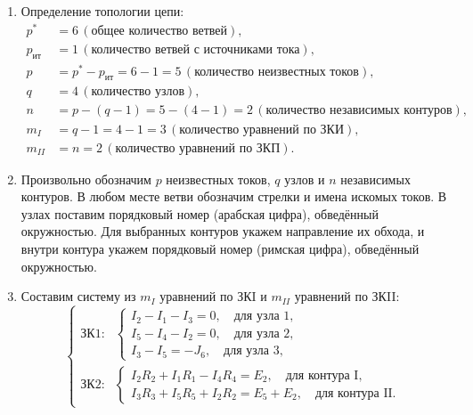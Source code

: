 \begin{enumerate}
	\item Определение топологии цепи:
	      \begin{align*}
		      p^*           & = 6 \, (\text{общее количество ветвей}),                                     \\
		      p_{\text{ит}} & = 1 \, (\text{количество ветвей с источниками тока}),                        \\
		      p             & = p^* - p_{\text{ит}} = 6 - 1 = 5 \, (\text{количество неизвестных токов}),  \\
		      q             & = 4 \, (\text{количество узлов}),                                            \\
		      n             & = p - (q - 1) = 5 - (4 - 1) = 2 \, (\text{количество независимых контуров}), \\
		      m_I           & = q - 1 = 4 - 1 = 3 \, (\text{количество уравнений по ЗКИ}),                 \\
		      m_{II}        & = n = 2 \, (\text{количество уравнений по ЗКП}).
	      \end{align*}

	\item Произвольно обозначим $p$ неизвестных токов, $q$ узлов и $n$ независимых контуров. В любом месте ветви обозначим стрелки и имена искомых токов. В узлах поставим порядковый номер (арабская цифра), обведённый окружностью. Для выбранных контуров укажем направление их обхода, и внутри контура укажем порядковый номер (римская цифра), обведённый окружностью.
	      

	\item Составим систему из $m_I$ уравнений по ЗКI и $m_{II}$ уравнений по ЗКII:
	      \[
		      \begin{cases}
			      \text{ЗК1:} & \begin{cases}
				                    I_2 - I_1 - I_3 = 0, \quad \text{для узла 1}, \\
				                    I_5 - I_4 - I_2 = 0, \quad \text{для узла 2}, \\
				                    I_3 - I_5 = -J_6, \quad \text{для узла 3},
			                    \end{cases}                        \\[10pt]
			      \text{ЗК2:} & \begin{cases}
				                    I_2 R_2 + I_1 R_1 - I_4 R_4 = E_2, \quad \text{для контура I}, \\
				                    I_3 R_3 + I_5 R_5 + I_2 R_2 = E_5 + E_2, \quad \text{для контура II}.
			                    \end{cases}
		      \end{cases}
	      \]


\end{enumerate}
